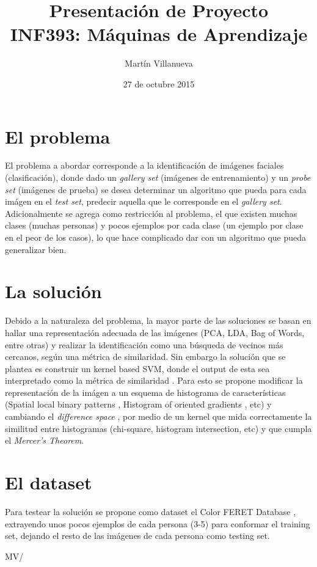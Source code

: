 \documentclass[spanish, fleqn]{article}
\title{Presentación de Proyecto \\INF393: Máquinas de Aprendizaje}
\author{Martín Villanueva}
\date{27 de octubre 2015}
\begin{document}
\maketitle

\thispagestyle{empty}


\section{El problema}

El problema a abordar corresponde a la identificación de imágenes faciales (clasificación), donde dado un \textit{gallery set} (imágenes de entrenamiento) y un \textit{probe set} (imágenes de prueba) se desea determinar un algoritmo que pueda para cada imágen en el \textit{test set}, predecir aquella que le corresponde en el \textit{gallery set}. Adicionalmente se agrega como restricción al problema, el que existen muchas clases (muchas personas) y pocos ejemplos por cada clase (un ejemplo por clase en el peor de los casos), lo que hace complicado dar con un algoritmo que pueda generalizar bien.  

\section{La solución}

Debido a la naturaleza del problema, la mayor parte de las soluciones se basan en hallar una representación adecuada de las imágenes (PCA, LDA, Bag of Words, entre otras) y realizar la identificación como una búsqueda de vecinos más cercanos, según una métrica de similaridad. Sin embargo la solución que se plantea es construir un kernel based SVM, donde el output de esta sea interpretado como la métrica de similaridad \footnotemark[1]. Para esto se propone modificar la representación de la imágen a un esquema de histograma de características (Spatial local binary patterns \footnotemark[2], Histogram of oriented gradients \footnotemark[3], etc) y cambiando el \textit{difference space} \footnotemark[1], por medio de un kernel que mida correctamente la similitud entre histogramas (chi-square, histogram intersection, etc) y que cumpla el \textit{Mercer's Theorem}.  

\section{El dataset}

Para testear la solución se propone como dataset el Color FERET Database \footnotemark[4], extrayendo unos pocos ejemplos de cada persona (3-5) para conformar el training set, dejando el resto de las imágenes de cada persona como testing set.

  



\vfill\hfill MV/\LaTeXe
\end{document}
